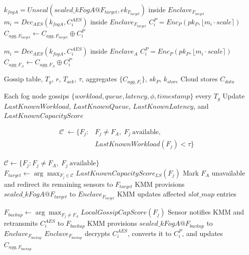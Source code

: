 \documentclass[conference]{IEEEtran}
\begin{document}
\begin{algorithm}
\begin{algorithmic}[1]
        \STATE $k_{fogA}=Unseal(sealed\_kFogA@F_{target},ek_{F_{target}})$ inside $Enclave_{F_{target}}$
        \STATE $m_i=Dec_{AES}(k_{fogA},C_i^{AES})$ inside $Enclave_{F_{target}}$
        \STATE $C_i^P=Enc_P(pk_P,\lfloor m_i\cdot scale\rceil)$
        \STATE $C_{agg,F_{target}}\leftarrow C_{agg,F_{target}}\oplus C_i^P$

    \ELSE
        \STATE $m_i=Dec_{AES}(k_{fogA},C_i^{AES})$ inside $Enclave_A$
        \STATE $C_i^P=Enc_P(pk_P,\lfloor m_i\cdot scale\rceil)$
        \STATE $C_{agg,F_A}\leftarrow C_{agg,F_A}\oplus C_i^P$
    \ENDIF
\ENDFOR

\end{algorithmic}
\end{algorithm}

\begin{algorithm}
\caption{Fault Recovery, Window Combine, and Secure Storage}
\label{alg:fault_window_storage}
\begin{algorithmic}[1]
\REQUIRE Gossip table, $T_g$, $r$, $T_{ack}$, $\tau$, aggregates $\{C_{agg,F_i}\}$, $sk_P$, $k_{store}$
\ENSURE Cloud stores $C_{data}$

\STATE Each fog node gossips $\{workload,queue,latency,\phi,timestamp\}$ every $T_g$
\STATE Update $LastKnownWorkload$, $LastKnownQueue$, $LastKnownLatency$, and $LastKnownCapacityScore$

    \STATE \[\begin{aligned}
        \mathcal{C}\;\leftarrow\{F_j: & F_j\neq F_A,\;F_j\ \text{available},\\
        & LastKnownWorkload(F_j)<\tau\}
        \end{aligned}
        \]

        
    
        \STATE $\mathcal{C}\leftarrow \{F_j:F_j\neq F_A,\;F_j\ \text{available}\}$
    \ENDIF
    \STATE $F_{target}\leftarrow \arg\max_{F_j\in\mathcal{C}} LastKnownCapacityScore_{LS}(F_j)$
    \STATE Mark $F_A$ unavailable and redirect its remaining sensors to $F_{target}$
    \STATE KMM provisions $sealed\_kFogA@F_{target}$ to $Enclave_{F_{target}}$
    \STATE KMM updates affected $slot\_map$ entries
\ENDIF

    \STATE $F_{backup}\leftarrow \arg\max_{F_j\neq F_A} LocalGossipCapScore(F_j)$
    \STATE Sensor notifies KMM and retransmits $C_i^{AES}$ to $F_{backup}$
    \STATE KMM provisions $sealed\_kFogA@F_{backup}$ to $Enclave_{F_{backup}}$
    \STATE $Enclave_{F_{backup}}$ decrypts $C_i^{AES}$, converts it to $C_i^P$, and updates $C_{agg,F_{backup}}$
\ENDIF


\end{algorithmic}
\end{algorithm}
\end{document}
